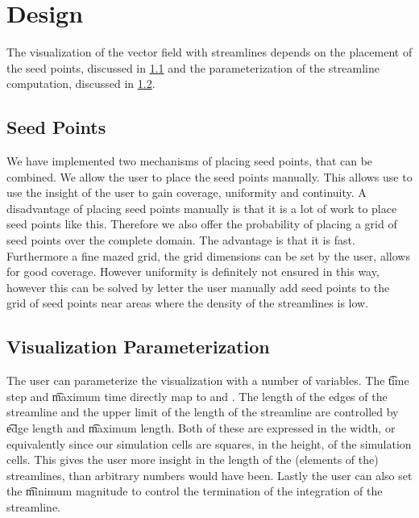 \section{Design}
\label{s:streamlines:design}
The visualization of the vector field with streamlines depends on the placement of the seed points, discussed in \cref{ss:streamlines:design:seedpoints} and the parameterization of the streamline computation, discussed in \cref{ss:streamlines:design:parameterization}.

\subsection{Seed Points}
\label{ss:streamlines:design:seedpoints}
We have implemented two mechanisms of placing seed points, that can be combined. We allow the user to place the seed points manually. This allows use to use the insight of the user to gain coverage, uniformity and continuity. A disadvantage of placing seed points manually is that it is a lot of work to place seed points like this. Therefore we also offer the probability of placing a grid of seed points over the complete domain. The advantage is that it is fast. Furthermore a fine mazed grid, the grid dimensions can be set by the user, allows for good coverage. However uniformity is definitely not ensured in this way, however this can be solved by letter the user manually add seed points to the grid of seed points near areas where the density of the streamlines is low.

\subsection{Visualization Parameterization}
\label{ss:streamlines:design:parameterization}
The user can parameterize the visualization with a number of variables. The \t{time step}  and \t{maximum time} directly map to \integrationTime and \timeInterval. The length of the edges of the streamline and the upper limit of the length of the streamline are controlled by \t{edge length} and \t{maximum length}. Both of these are expressed in the width, or equivalently since our simulation cells are squares, in the height, of the simulation cells. This gives the user more insight in the length of the (elements of the) streamlines, than arbitrary numbers would have been. Lastly the user can also set the \t{minimum magnitude} to control the termination of the integration of the streamline.